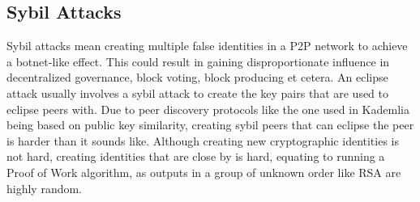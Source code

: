 \subsection{Sybil Attacks}
Sybil attacks mean creating multiple false identities in a P2P network to achieve a botnet-like effect. This could result in gaining disproportionate influence in decentralized governance, block voting, block producing et cetera. An eclipse attack usually involves a sybil attack to create the key pairs that are used to eclipse peers with. Due to peer discovery protocols like the one used in Kademlia being based on public key similarity, creating sybil peers that can eclipse the peer is harder than it sounds like. Although creating new cryptographic identities is not hard, creating identities that are close by is hard, equating to running a Proof of Work algorithm, as outputs in a group of unknown order like RSA are highly random.
